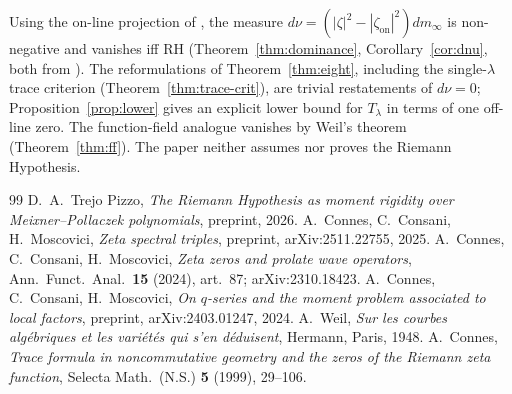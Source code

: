 \documentclass[11pt]{amsart}
\theoremstyle{definition}
\theoremstyle{remark}
\newcommand{\RH}{\mathrm{RH}}
\newcommand{\dnu}{d\nu}
\newcommand{\zon}{\zeta_{\mathrm{on}}}
\newcommand{\Tlam}{T_\lambda}
\begin{document}
Using the on-line projection of \cite{MomentRigidity}, the measure
$\dnu=(|\zeta|^2-|\zon|^2)dm_\infty$ is non-negative and vanishes iff $\RH$
(Theorem~\ref{thm:dominance}, Corollary~\ref{cor:dnu}, both from \cite{MomentRigidity}). The
reformulations of Theorem~\ref{thm:eight}, including the single-$\lambda$ trace criterion
(Theorem~\ref{thm:trace-crit}), are trivial restatements of $\dnu=0$; Proposition~\ref{prop:lower}
gives an explicit lower bound for $\Tlam$ in terms of one off-line zero. The function-field
analogue vanishes by Weil's theorem (Theorem~\ref{thm:ff}). The paper neither assumes nor proves
the Riemann Hypothesis.

\begin{thebibliography}{99}
 D.~A.~Trejo Pizzo, \emph{The Riemann Hypothesis as moment rigidity over
Meixner--Pollaczek polynomials}, preprint, 2026.
 A.~Connes, C.~Consani, H.~Moscovici, \emph{Zeta spectral triples}, preprint,
arXiv:2511.22755, 2025.
 A.~Connes, C.~Consani, H.~Moscovici, \emph{Zeta zeros and prolate wave
operators}, Ann.\ Funct.\ Anal.\ \textbf{15} (2024), art.~87; arXiv:2310.18423.
 A.~Connes, C.~Consani, H.~Moscovici, \emph{On $q$-series and the moment problem
associated to local factors}, preprint, arXiv:2403.01247, 2024.
 A.~Weil, \emph{Sur les courbes alg\'ebriques et les vari\'et\'es qui s'en
d\'eduisent}, Hermann, Paris, 1948.
 A.~Connes, \emph{Trace formula in noncommutative geometry and the zeros of
the Riemann zeta function}, Selecta Math.\ (N.S.) \textbf{5} (1999), 29--106.
\end{thebibliography}
\end{document}
